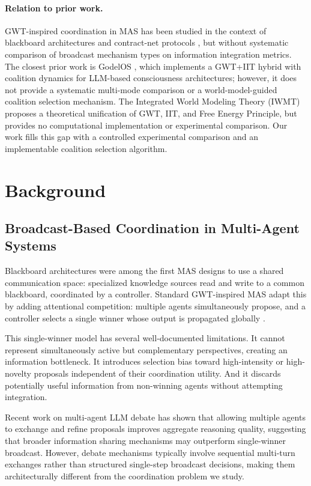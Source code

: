 \documentclass[11pt]{article}
\theoremstyle{definition}
\begin{document}
\paragraph{Relation to prior work.}
GWT-inspired coordination in MAS has been studied in the context of blackboard architectures
\citep{nii1986} and contract-net protocols \citep{smith1980}, but without systematic
comparison of broadcast mechanism types on information integration metrics. The closest
prior work is GodelOS \citep{steake2025}, which implements a GWT+IIT hybrid with coalition
dynamics for LLM-based consciousness architectures; however, it does not provide a
systematic multi-mode comparison or a world-model-guided coalition selection mechanism.
The Integrated World Modeling Theory (IWMT) \citep{safron2020} proposes a theoretical
unification of GWT, IIT, and Free Energy Principle, but provides no computational
implementation or experimental comparison. Our work fills this gap with a controlled
experimental comparison and an implementable coalition selection algorithm.


\section{Background}
\label{sec:background}

\subsection{Broadcast-Based Coordination in Multi-Agent Systems}

Blackboard architectures \citep{nii1986} were among the first MAS designs to use a
shared communication space: specialized knowledge sources read and write to a common
blackboard, coordinated by a controller. Standard GWT-inspired MAS adapt this by adding
attentional competition: multiple agents simultaneously propose, and a controller selects
a single winner whose output is propagated globally \citep{baars1988,dehaene2011}.

This single-winner model has several well-documented limitations. It cannot represent
simultaneously active but complementary perspectives, creating an information bottleneck.
It introduces selection bias toward high-intensity or high-novelty proposals independent
of their coordination utility. And it discards potentially useful information from
non-winning agents without attempting integration.

Recent work on multi-agent LLM debate \citep{du2023,chan2023} has shown that allowing
multiple agents to exchange and refine proposals improves aggregate reasoning quality,
suggesting that broader information sharing mechanisms may outperform single-winner broadcast.
However, debate mechanisms typically involve sequential multi-turn exchanges rather than
structured single-step broadcast decisions, making them architecturally different from
the coordination problem we study.
\end{document}
